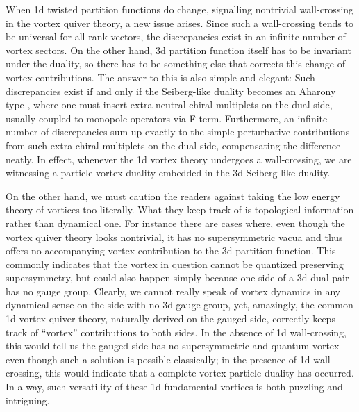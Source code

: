 \documentclass[a4paper,11pt]{article}
\begin{document}
When 1d twisted partition functions do change, signalling
nontrivial wall-crossing in the vortex quiver theory, a new
issue arises. Since such a wall-crossing tends to be universal
for all rank vectors, the discrepancies exist in an infinite number
of vortex sectors. On the other hand, 3d partition function
itself has to be invariant under the duality, so there has to be
something else that corrects this change of vortex contributions.
The answer to this is also simple and elegant: Such discrepancies
exist if and only if the Seiberg-like duality becomes an Aharony
type \cite{Aharony:1997gp}, where one must insert extra neutral
chiral multiplets on the dual side, usually coupled to monopole
operators via F-term. Furthermore, an infinite number of
discrepancies sum up exactly to the simple perturbative
contributions from such extra chiral multiplets
on the dual side, compensating the difference neatly.
In effect, whenever the 1d vortex theory undergoes
a wall-crossing, we are witnessing a particle-vortex duality
embedded in the 3d Seiberg-like duality.


On the other hand, we must  caution the readers against taking the
low energy theory of vortices too literally. What they keep
track of is topological information rather than dynamical one.
For instance there are cases where, even though the vortex quiver
theory looks nontrivial, it has no supersymmetric vacua and thus
offers no accompanying vortex contribution to the 3d partition
function. This commonly indicates that the vortex in question
cannot be quantized preserving supersymmetry, but could also
happen simply because one side of a 3d dual pair has no gauge group.
Clearly, we cannot really speak of vortex dynamics in any dynamical
sense on the side with no 3d gauge group, yet, amazingly, the
common 1d vortex quiver theory, naturally derived on the gauged
side, correctly keeps track of ``vortex'' contributions to both sides.
In the absence of 1d wall-crossing, this would tell us the gauged
side has no supersymmetric and quantum vortex even though such a
solution is possible classically; in the presence of 1d wall-crossing,
this would indicate that a complete vortex-particle duality has occurred. In a way, such versatility of these 1d fundamental
vortices is both puzzling and intriguing.
\end{document}
